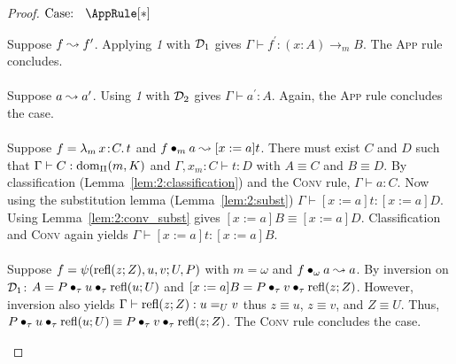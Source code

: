 \begin{proof}
    $\text{Case: }\begin{array}{c} \AppRule[*] \end{array}$
    \begin{proofcase}
        Suppose $f \leadsto f^\prime$.
        Applying \textit{1} with $\mathcal{D}_{1}$ gives $\Gamma \vdash f^\prime : (x : A) \to_m B$.
        The \textsc{App} rule concludes.
        \\ \\
        Suppose $a \leadsto a^\prime$.
        Using \textit{1} with $\mathcal{D}_{2}$ gives $\Gamma \vdash a^\prime : A$.
        Again, the \textsc{App} rule concludes the case.
        \\ \\
        Suppose $f = {\lambda_m}\, x\! : \! C.\, t$ and $f \bullet_{m} a \leadsto [x := a]t$.
        There must exist $C$ and $D$ such that $\Gamma \vdash C : \textnormal{dom}_\Pi(m, K)$ and $\Gamma, x_m : C \vdash t : D$ with $A \equiv C$ and $B \equiv D$.
        By classification (Lemma~\ref{lem:2:classification}) and the \textsc{Conv} rule, $\Gamma \vdash a : C$.
        Now using the substitution lemma (Lemma~\ref{lem:2:subst}) $\Gamma \vdash [x := a]t : [x := a]D$.
        Using Lemma~\ref{lem:2:conv_subst} gives $[x := a]B \equiv [x := a]D$.
        Classification and \textsc{Conv} again yields $\Gamma \vdash [x := a]t : [x := a]B$.
        \\ \\
        Suppose $f = \psi(\textnormal{refl}(z;Z), u, v; U, P)$ with $m = \omega$ and $f \bullet_{\omega} a \leadsto a$.
        By inversion on $\mathcal{D}_{1}$: $A = P \bullet_{\tau} u \bullet_{\tau} \textnormal{refl}(u;U)$ and $[x := a]B = P \bullet_{\tau} v \bullet_{\tau} \textnormal{refl}(z;Z)$.
        However, inversion also yields $\Gamma \vdash \textnormal{refl}(z;Z) : u =_U v$ thus $z \equiv u$, $z \equiv v$, and $Z \equiv U$.
        Thus, $P \bullet_{\tau} u \bullet_{\tau} \textnormal{refl}(u;U) \equiv P \bullet_{\tau} v \bullet_{\tau} \textnormal{refl}(z;Z)$.
        The \textsc{Conv} rule concludes the case.
    \end{proofcase}


\end{proof}
